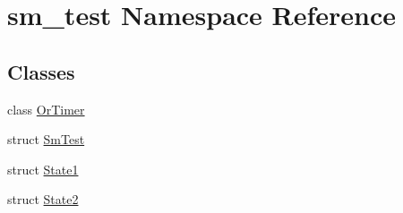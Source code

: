 \hypertarget{namespacesm__test}{}\section{sm\+\_\+test Namespace Reference}
\label{namespacesm__test}
\subsection*{Classes}
\begin{DoxyCompactItemize}
\item 
class \hyperlink{classsm__test_1_1OrTimer}{Or\+Timer}
\item 
struct \hyperlink{structsm__test_1_1SmTest}{Sm\+Test}
\item 
struct \hyperlink{structsm__test_1_1State1}{State1}
\item 
struct \hyperlink{structsm__test_1_1State2}{State2}
\end{DoxyCompactItemize}
